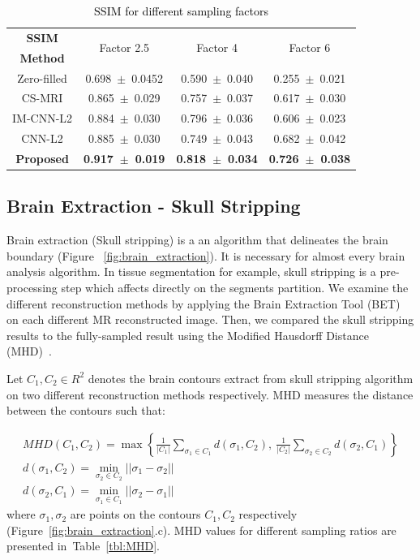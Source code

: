 \documentclass[review]{elsarticle}
\begin{document}
\begin{table}[H]
	\centering{}
	\begin{tabular}{|c||c||c||c|}
		\hline 
		\textbf{SSIM} & \multicolumn{1}{c||}{\multirow{2}{*}{Factor 2.5}} & \multicolumn{1}{c||}{\multirow{2}{*}{Factor 4}} & \multicolumn{1}{c|}{\multirow{2}{*}{Factor 6}} \tabularnewline
		\textbf{Method} & \multicolumn{1}{c||}{} & \multicolumn{1}{c||}{} & \multicolumn{1}{c|}{} \tabularnewline \cline{1-4}
		
		Zero-filled         &0.698~$\pm$~0.0452  &0.590~$\pm$~0.040   &0.255~$\pm$~0.021\tabularnewline
		CS-MRI              &0.865~$\pm$~0.029  &0.757~$\pm$~0.037   &0.617~$\pm$~0.030\tabularnewline
		IM-CNN-L2           &0.884~$\pm$~0.030  &0.796~$\pm$~0.036   &0.606~$\pm$~0.023\tabularnewline
		CNN-L2              &0.885~$\pm$~0.030  &0.749~$\pm$~0.043   &0.682~$\pm$~0.042\tabularnewline
		\textbf{Proposed}   &\textbf{0.917~$\pm$~0.019}  &\textbf{0.818~$\pm$~0.034}   &\textbf{0.726~$\pm$~0.038}\tabularnewline
		\hline 
	\end{tabular}\caption{\textcolor{black}{\footnotesize{}{}SSIM for different sampling factors}{\footnotesize{}\label{tbl:SSIM_NO_MASK}}}
\end{table}


\subsection{Brain Extraction - Skull Stripping}
Brain extraction (Skull stripping) is a an algorithm that delineates the brain boundary (Figure~ \ref{fig:brain_extraction}). It is necessary for almost every brain analysis algorithm. In tissue segmentation for example, skull stripping is a pre-processing step which affects directly on the segments partition. We examine the different reconstruction methods by applying the Brain Extraction Tool (BET) \cite{smith2002fast} on each different MR reconstructed image. Then, we compared the skull stripping results to the fully-sampled result using the Modified Hausdorff Distance (MHD)~\cite{dubuisson1994modified}.

Let $C_1,C_2\in R^2$ denotes the brain contours extract from skull stripping algorithm on two different reconstruction methods respectively. MHD measures the distance between the contours such that:

\begin{equation}
\begin{array}{cc}
MHD(C_1,C_2) = \max \left\{\frac{1}{|C_1|} \sum_{\sigma_{1}\in C_1}^{}d(\sigma_1,C_2), ~ \frac{1}{|C_2|} \sum_{\sigma_{2}\in C_2}^{}d(\sigma_2,C_1)\right\} \\
d(\sigma_1,C_2) = \underset{\sigma_{2}\in C_{2}}{\min}||\sigma_1-\sigma_2|| \\
d(\sigma_2,C_1) = \underset{\sigma_{1}\in C_{1}}{\min}||\sigma_2-\sigma_1||
\end{array}
\end{equation}
where $\sigma_1,\sigma_2$ are points on the contours $C_1,C_2$ respectively (Figure~\ref{fig:brain_extraction}.c). MHD values for different sampling ratios are presented in~Table~\ref{tbl:MHD}.
\end{document}
